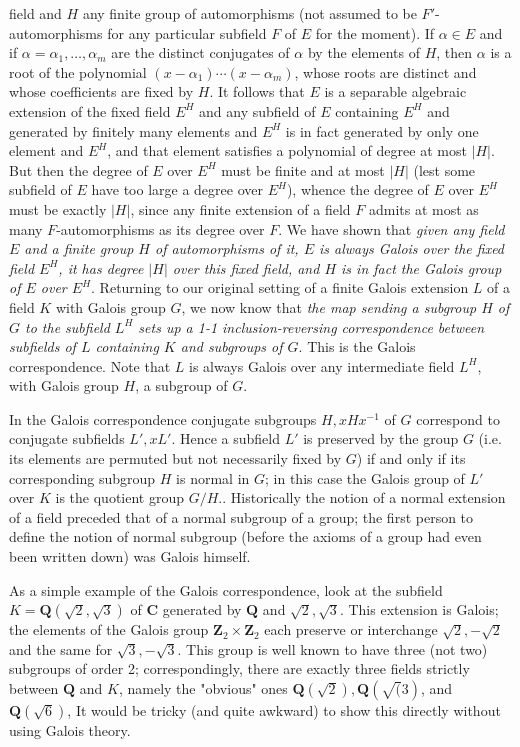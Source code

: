\documentclass[10pt]{article}
\begin{document}
field and $H$ any finite group of automorphisms (not assumed to be
$F'$-automorphisms for any particular subfield $F$ of $E$ for the
moment). If $\alpha\in E$ and if $\alpha=\alpha_1,\ldots,\alpha_m$ are
the distinct conjugates of $\alpha$ by the elements of $H$, then
$\alpha$ is a root of the polynomial $(x-\alpha_1)\cdots(x-\alpha_m)$,
whose roots are distinct and whose coefficients are fixed by $H$. It
follows that $E$ is a separable algebraic extension of the fixed field
$E^H$ and any subfield of $E$ containing $E^H$ and generated by finitely
many elements and $E^H$ is in fact generated by only one element and
$E^H$, and that element satisfies a polynomial of degree at most $|H|$.
But then the degree of $E$ over $E^H$ must be finite and at most $|H|$
(lest some subfield of $E$ have too large a degree over $E^H$), whence
the degree of $E$ over $E^H$ must be exactly $|H|$, since any finite
extension of a field $F$ admits at most as many $F$-automorphisms as its
degree over $F$. We have shown that {\sl given any field $E$ and a
  finite group $H$ of automorphisms of it, $E$ is always Galois over the
  fixed field $E^H$, it has degree $|H|$ over this fixed field, and $H$
  is in fact the Galois group of $E$ over $E^H$}. Returning to our
original setting of a finite Galois extension $L$ of a field $K$ with
Galois group $G$, we now know that {\sl the map sending a subgroup $H$
  of $G$ to the subfield $L^H$ sets up a 1-1 inclusion-reversing
  correspondence between subfields of $L$ containing $K$ and subgroups
  of $G$}. This is the Galois correspondence. Note that $L$ is always
Galois over any intermediate field $L^H$, with Galois group $H$, a
subgroup of $G$.

In the Galois correspondence conjugate subgroups $H,xHx^{-1}$ of $G$
correspond to conjugate subfields $L',xL'$. Hence a subfield $L'$ is
preserved by the group $G$ (i.e. its elements are permuted but not
necessarily fixed by $G$) if and only if its corresponding subgroup $H$
is normal in $G$; in this case the Galois group of $L'$ over $K$ is the
quotient group $G/H$.. Historically the notion of a normal extension of
a field preceded that of a normal subgroup of a group; the first person
to define the notion of normal subgroup (before the axioms of a group
had even been written down) was Galois himself.

As a simple example of the Galois correspondence, look at the subfield
$K=\mathbf Q(\sqrt{2},\sqrt{3})$ of $\mathbf C$ generated by $\mathbf Q$
and $\sqrt{2},\sqrt{3}$. This extension is Galois; the elements of the
Galois group $\mathbf Z_2\times\mathbf Z_2$ each preserve or interchange
$\sqrt{2},-\sqrt{2}$ and the same for $\sqrt{3},-\sqrt{3}$. This group
is well known to have three (not two) subgroups of order 2;
correspondingly, there are exactly three fields strictly between
$\mathbf Q$ and $K$, namely the "obvious" ones $\mathbf
Q(\sqrt{2}),\mathbf Q(\sqrt(3)$, and $\mathbf Q(\sqrt{6})$, It would be
tricky (and quite awkward) to show this directly without using Galois
theory.
\end{document}
